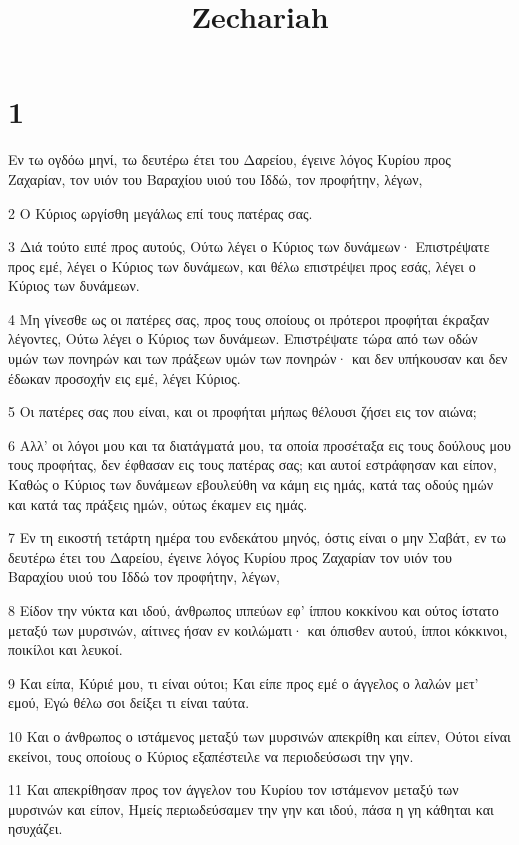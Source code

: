 

\title{Zechariah}


\chapter{1}

\par Εν τω ογδόω μηνί, τω δευτέρω έτει του Δαρείου, έγεινε λόγος Κυρίου προς Ζαχαρίαν, τον υιόν του Βαραχίου υιού του Ιδδώ, τον προφήτην, λέγων,
\par 2 Ο Κύριος ωργίσθη μεγάλως επί τους πατέρας σας.
\par 3 Διά τούτο ειπέ προς αυτούς, Ούτω λέγει ο Κύριος των δυνάμεων· Επιστρέψατε προς εμέ, λέγει ο Κύριος των δυνάμεων, και θέλω επιστρέψει προς εσάς, λέγει ο Κύριος των δυνάμεων.
\par 4 Μη γίνεσθε ως οι πατέρες σας, προς τους οποίους οι πρότεροι προφήται έκραξαν λέγοντες, Ούτω λέγει ο Κύριος των δυνάμεων. Επιστρέψατε τώρα από των οδών υμών των πονηρών και των πράξεων υμών των πονηρών· και δεν υπήκουσαν και δεν έδωκαν προσοχήν εις εμέ, λέγει Κύριος.
\par 5 Οι πατέρες σας που είναι, και οι προφήται μήπως θέλουσι ζήσει εις τον αιώνα;
\par 6 Αλλ' οι λόγοι μου και τα διατάγματά μου, τα οποία προσέταξα εις τους δούλους μου τους προφήτας, δεν έφθασαν εις τους πατέρας σας; και αυτοί εστράφησαν και είπον, Καθώς ο Κύριος των δυνάμεων εβουλεύθη να κάμη εις ημάς, κατά τας οδούς ημών και κατά τας πράξεις ημών, ούτως έκαμεν εις ημάς.
\par 7 Εν τη εικοστή τετάρτη ημέρα του ενδεκάτου μηνός, όστις είναι ο μην Σαβάτ, εν τω δευτέρω έτει του Δαρείου, έγεινε λόγος Κυρίου προς Ζαχαρίαν τον υιόν του Βαραχίου υιού του Ιδδώ τον προφήτην, λέγων,
\par 8 Είδον την νύκτα και ιδού, άνθρωπος ιππεύων εφ' ίππου κοκκίνου και ούτος ίστατο μεταξύ των μυρσινών, αίτινες ήσαν εν κοιλώματι· και όπισθεν αυτού, ίπποι κόκκινοι, ποικίλοι και λευκοί.
\par 9 Και είπα, Κύριέ μου, τι είναι ούτοι; Και είπε προς εμέ ο άγγελος ο λαλών μετ' εμού, Εγώ θέλω σοι δείξει τι είναι ταύτα.
\par 10 Και ο άνθρωπος ο ιστάμενος μεταξύ των μυρσινών απεκρίθη και είπεν, Ούτοι είναι εκείνοι, τους οποίους ο Κύριος εξαπέστειλε να περιοδεύσωσι την γην.
\par 11 Και απεκρίθησαν προς τον άγγελον του Κυρίου τον ιστάμενον μεταξύ των μυρσινών και είπον, Ημείς περιωδεύσαμεν την γην και ιδού, πάσα η γη κάθηται και ησυχάζει.
